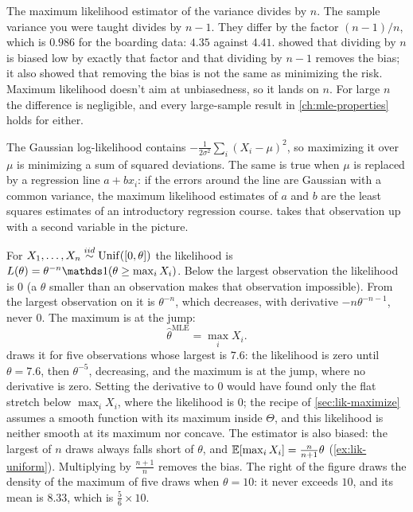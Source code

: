 \begin{bridge}[$n$ or $n - 1$?]
The maximum likelihood estimator of the variance divides by $n$.
The sample variance you were taught divides by $n - 1$.
They differ by the factor $(n - 1)/n$, which is $0.986$ for the boarding data: $4.35$ against $4.41$.
 showed that dividing by $n$ is biased low by exactly that factor and that dividing by $n - 1$ removes the bias; it also showed that removing the bias is not the same as minimizing the risk.
Maximum likelihood doesn't aim at unbiasedness, so it lands on $n$.
For large $n$ the difference is negligible, and every large-sample result in \cref{ch:mle-properties} holds for either.
\end{bridge}

\begin{bridge}
The Gaussian log-likelihood contains $-\frac{1}{2\sigma^2}\sum_i (X_i - \mu)^2$, so maximizing it over $\mu$ is minimizing a sum of squared deviations.
The same is true when $\mu$ is replaced by a regression line $a + b x_i$: if the errors around the line are Gaussian with a common variance, the maximum likelihood estimates of $a$ and $b$ are the least squares estimates of an introductory regression course.
 takes that observation up with a second variable in the picture.
\end{bridge}

\begin{worked}
For $X_1, \ldots, X_n \stackrel{iid}{\sim} \mathrm{Unif}([0, \theta])$ the likelihood is $L(\theta) = \theta^{-n}\ind(\theta \geq \max_i X_i)$.
Below the largest observation the likelihood is $0$ (a $\theta$ smaller than an observation makes that observation impossible). From the largest observation on it is $\theta^{-n}$, which decreases, with derivative $-n\theta^{-n-1}$, never $0$.
The maximum is at the jump:
\[
\hat{\theta}^{\text{MLE}} = \max_i X_i.
\]
 draws it for five observations whose largest is $7.6$: the likelihood is zero until $\theta = 7.6$, then $\theta^{-5}$, decreasing, and the maximum is at the jump, where no derivative is zero.
Setting the derivative to $0$ would have found only the flat stretch below $\max_i X_i$, where the likelihood is $0$; the recipe of \cref{sec:lik-maximize} assumes a smooth function with its maximum inside $\Theta$, and this likelihood is neither smooth at its maximum nor concave.
The estimator is also biased: the largest of $n$ draws always falls short of $\theta$, and $\operatorname*{\mathbb{E}}[\max_i X_i] = \frac{n}{n+1}\theta$ (\cref{ex:lik-uniform}). Multiplying by $\frac{n+1}{n}$ removes the bias.
The right of the figure draws the density of the maximum of five draws when $\theta = 10$: it never exceeds $10$, and its mean is $8.33$, which is $\frac56 \times 10$.
\end{worked}

